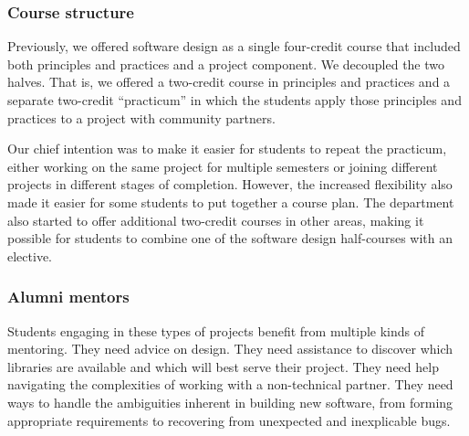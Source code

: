\subsubsection{Course structure}

Previously, we offered software design as a single
four-credit course that included both principles and practices
and a project component.  We decoupled the two halves.  That is,
we offered a two-credit course in principles and practices and a
separate two-credit ``practicum'' in which the students apply those
principles and practices to a project with community partners.

Our chief intention was to make it easier for students to repeat
the practicum, either working on the same project for multiple semesters
or joining different projects in different stages of completion.
However, the increased flexibility also made it easier for some students
to put together a course plan. 
The department also started to offer additional two-credit
courses in other areas, making it possible for students to combine
one of the software design half-courses with an elective.

\subsubsection{Alumni mentors}

Students engaging in these types of projects benefit from multiple
kinds of mentoring.  They need advice on design.  They need
assistance to discover which libraries are available and which will
best serve their project.  They need help navigating the complexities
of working with a non-technical partner.  They need
ways to handle the ambiguities inherent in building new software,
from forming appropriate requirements to recovering from unexpected
and inexplicable bugs.

